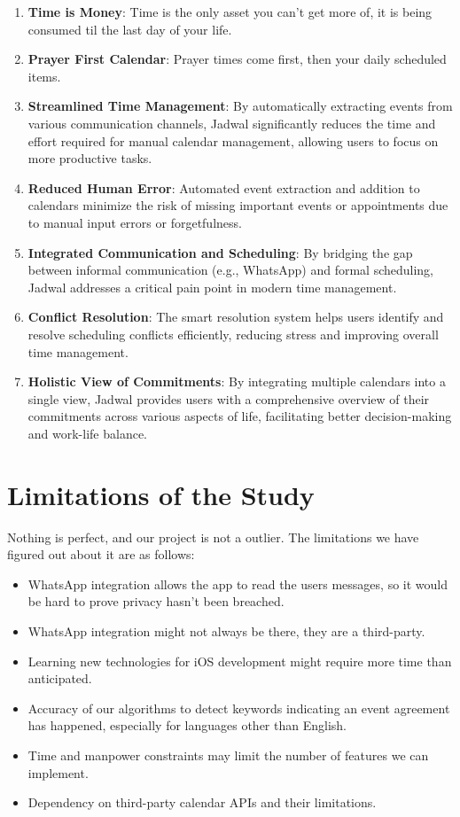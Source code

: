 \documentclass[12pt,a4paper]{report}
\begin{document}
\begin{enumerate}
    \item \textbf{Time is Money}: Time is the only asset you can't get more of, it is being consumed til the last day of your life.
    \item \textbf{Prayer First Calendar}: Prayer times come first, then your daily scheduled items.
    \item \textbf{Streamlined Time Management}: By automatically extracting events from various communication channels, Jadwal significantly reduces the time and effort required for manual calendar management, allowing users to focus on more productive tasks.
    \item \textbf{Reduced Human Error}: Automated event extraction and addition to calendars minimize the risk of missing important events or appointments due to manual input errors or forgetfulness.
    \item \textbf{Integrated Communication and Scheduling}: By bridging the gap between informal communication (e.g., WhatsApp) and formal scheduling, Jadwal addresses a critical pain point in modern time management.
    \item \textbf{Conflict Resolution}: The smart resolution system helps users identify and resolve scheduling conflicts efficiently, reducing stress and improving overall time management.
    \item \textbf{Holistic View of Commitments}: By integrating multiple calendars into a single view, Jadwal provides users with a comprehensive overview of their commitments across various aspects of life, facilitating better decision-making and work-life balance.
\end{enumerate}

\section{Limitations of the Study}

Nothing is perfect, and our project is not a outlier. The limitations we have figured out about it are as follows:

\begin{itemize}
    \item WhatsApp integration allows the app to read the users messages, so it would be hard to prove privacy hasn't been breached.
    \item WhatsApp integration might not always be there, they are a third-party.
    \item Learning new technologies for iOS development might require more time than anticipated.
    \item Accuracy of our algorithms to detect keywords indicating an event agreement has happened, especially for languages other than English.
    \item Time and manpower constraints may limit the number of features we can implement.
    \item Dependency on third-party calendar APIs and their limitations.
\end{itemize}
\end{document}
